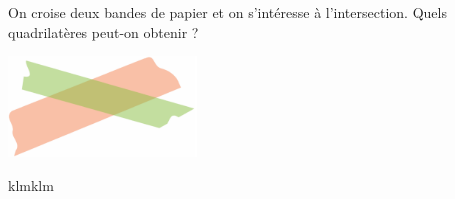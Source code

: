 
On croise deux bandes de papier et on s'intéresse à l'intersection.  Quels quadrilatères peut-on obtenir ?
\begin{center}
\includegraphics[width=5cm]{deux_bandes.pdf}
\end{center}
klmklm

